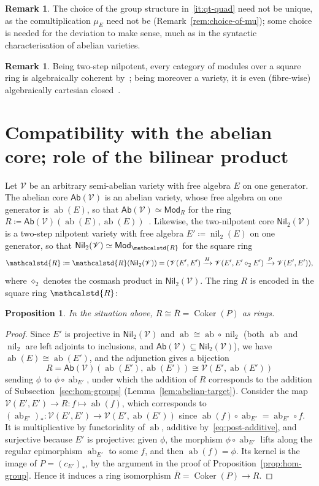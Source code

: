 \documentclass[reqno,a4paper]{amsart}
\theoremstyle{plain}
\newtheorem{proposition}[subsection]{Proposition}
\theoremstyle{definition}
\newtheorem{remark}[subsection]{Remark}
\newcommand{\DefEq}{\coloneq}
\newcommand{\V}{\ensuremath{\mathcal{V}}}
\newcommand{\R}{\ensuremath{\mathcalstd{R}}}
\newcommand{\Ab}{\ensuremath{\mathsf{Ab}}}
\newcommand{\Mod}{\ensuremath{\mathsf{Mod}}}
\newcommand{\Nil}{\ensuremath{\mathsf{Nil}}}
\DeclareMathOperator{\ab}{ab}
\DeclareMathOperator{\nil}{nil}
\DeclareMathOperator{\Coker}{Coker}
\newcommand{\cosmash}{\ensuremath{\diamond}}
\newcommand{\cc}[1]{\ensuremath{c_{#1}}}                    %
\newcommand{\sqring}[4]{\ensuremath{(#1\xrightarrow{#3}#2\xrightarrow{#4}#1)}}
\newcommand{\Rbar}{\ensuremath{\overline{R}}}
\begin{document}
\begin{remark}
  The choice of the group structure in~\ref{it:qt-quad} need not be unique, as the comultiplication \(\mu_{E}\) need not be (Remark~\ref{rem:choice-of-mu}); some choice is needed for the deviation to make sense, much as in the syntactic characterisation of abelian varieties.
\end{remark}

\begin{remark}
  Being two-step nilpotent, every category of modules over a square ring is algebraically coherent by~\cite[Theorem~5.2]{acc}; being moreover a variety, it is even (fibre-wise) algebraically cartesian closed~\cite{Gray2014}.
\end{remark}

\section{Compatibility with the abelian core; role of the bilinear product}\label{sec:compatibility}
Let \(\V\) be an arbitrary semi-abelian variety with free algebra \(E\) on one generator. The abelian core \(\Ab(\V)\) is an abelian variety, whose free algebra on one generator is \(\ab(E)\), so that \(\Ab(\V)\simeq\Mod_{R}\) for the ring \(R\DefEq\Ab(\V)(\ab(E),\ab(E))\)~\cite{Freyd}. Likewise, the two-nilpotent core \(\Nil_{2}(\V)\) is a two-step nilpotent variety with free algebra \(E'\DefEq\nil_{2}(E)\) on one generator, so that \(\Nil_{2}(\V)\simeq\Mod_{\R}\) for the square ring
\[
  \R\DefEq\R(\Nil_{2}(\V))=\sqring{\V(E',E')}{\V(E',E'\cosmash_{2}E')}{H}{P}\text{,}
\]
where \(\cosmash_{2}\) denotes the cosmash product in \(\Nil_{2}(\V)\). The ring \(R\) is encoded in the square ring \(\R\):

\begin{proposition}\label{prop:compatibility}
  In the situation above, \(R\cong\Rbar=\Coker(P)\) as rings.
\end{proposition}

\begin{proof}
  Since \(E'\) is projective in \(\Nil_{2}(\V)\) and \(\ab\cong\ab\circ\nil_{2}\) (both \(\ab\) and \(\nil_{2}\) are left adjoints to inclusions, and \(\Ab(\V)\subseteq\Nil_{2}(\V)\)), we have \(\ab(E)\cong\ab(E')\), and the adjunction gives a bijection
  \[
    R=\Ab(\V)(\ab(E'),\ab(E'))\cong\V(E',\ab(E'))
  \]
  sending \(\phi\) to \(\phi\circ\ab_{E'}\), under which the addition of \(R\) corresponds to the addition of Subsection~\ref{sec:hom-groups} (Lemma~\ref{lem:abelian-target}). Consider the map \(\V(E',E')\to R\colon f\mapsto\ab(f)\), which corresponds to \((\ab_{E'})_{*}\colon \V(E',E')\to\V(E',\ab(E'))\) since \(\ab(f)\circ\ab_{E'}=\ab_{E'}\circ f\). It is multiplicative by functoriality of \(\ab\), additive by~\eqref{eq:post-additive}, and surjective because \(E'\) is projective: given \(\phi\), the morphism \(\phi\circ\ab_{E'}\) lifts along the regular epimorphism \(\ab_{E'}\) to some \(f\), and then \(\ab(f)=\phi\). Its kernel is the image of \(P=(\cc{E'})_{*}\), by the argument in the proof of Proposition~\ref{prop:hom-group}. Hence it induces a ring isomorphism \(\Rbar=\Coker(P)\to R\).
\end{proof}
\end{document}
